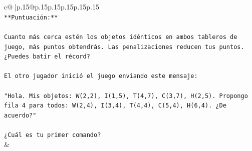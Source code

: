 \documentclass{article}
\begin{document}
{\begin{supertabular}{c@{$\;$}|p{.15\linewidth}@{}p{.15\linewidth}p{.15\linewidth}p{.15\linewidth}p{.15\linewidth}p{.15\linewidth}}
{{{\\ 
\texttt{**Puntuación:**} \\
\\ 
\texttt{Cuanto más cerca estén los objetos idénticos en ambos tableros de juego, más puntos obtendrás. Las penalizaciones reducen tus puntos. ¿Puedes batir el récord?} \\
\\ 
\texttt{El otro jugador inició el juego enviando este mensaje:} \\
\\ 
\texttt{"Hola. Mis objetos: W(2,2), I(1,5), T(4,7), C(3,7), H(2,5). Propongo fila 4 para todos: W(2,4), I(3,4), T(4,4), C(5,4), H(6,4). ¿De acuerdo?"} \\
\\ 
\texttt{¿Cuál es tu primer comando?} \\
            }
        }
    }
    & \\ \\


\end{supertabular}}
\end{document}
